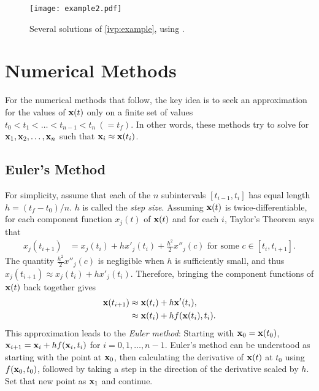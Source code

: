 \begin{figure}[H]
\centering
\texttt{[image: example2.pdf]}
\caption{Several solutions of \eqref{ivp:example}, using . }
\label{ivp:int_curves}
\end{figure}


\section*{Numerical Methods}
For the numerical methods that follow, the key idea is to seek an approximation for the values of $\mathbf{x}(t)$ only on a finite set of values $t_0 < t_1 < \hdots < t_{n-1} < t_n \ (= t_f)$.
In other words, these methods try to solve for $\mathbf{x}_1,\mathbf{x}_2,\hdots,\mathbf{x}_n$ such that $\mathbf{x}_i \approx \mathbf{x}(t_i)$.

\subsection*{Euler's Method}
For simplicity, assume that each of the $n$ subintervals $[t_{i-1},t_i]$ has equal length $h = (t_f-t_0)/n$. $h$ is called the \textit{step size}.
Assuming $\mathbf{x}(t)$ is twice-differentiable, for each component function $x_j(t)$ of $\mathbf{x}(t)$ and for each $i$, Taylor's Theorem says that
\begin{align*}
x_j(t_{i+1}) &= x_j(t_{i}) + h x'_j(t_i) + \frac{h^2}{2} x''_j(c)\text{ for some } c \in [t_i,t_{i+1}].
\end{align*}
The quantity $\frac{h^2}{2} x''_j(c)$ is negligible when $h$ is sufficiently small, and thus $x_j(t_{i+1}) \approx x_j(t_i) + h x'_j(t_i)$.
Therefore, bringing the component functions of $\mathbf{x}(t)$ back together gives
\begin{align*}
\mathbf{x}(t_{i+1}) &\approx \mathbf{x}(t_i) + h \mathbf{x}'(t_i)  ,\\
&\approx \mathbf{x}(t_{i}) + h f(\mathbf{x}(t_i),t_i).
\end{align*}
This approximation leads to the \textit{Euler method}: Starting with $\mathbf{x}_0 = \mathbf{x}(t_0)$, $\mathbf{x}_{i+1} = \mathbf{x}_i +hf(\mathbf{x}_i,t_i)$ for $i = 0, 1, \hdots, n-1$.
Euler's method can be understood as starting with the point at $\mathbf{x}_0$, then calculating the derivative of $\mathbf{x}(t)$ at $t_0$ using $f(\mathbf{x}_0,t_0)$, followed by taking a step in the direction of the derivative scaled by $h$. Set that new point as $\mathbf{x}_1$ and continue.

